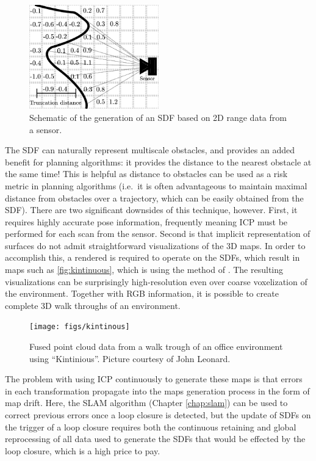 \begin{figure}
    \centering
    \includegraphics[width=0.5\textwidth]{figs/sdf.png}
    \caption{Schematic of the generation of an SDF based on 2D range data from a sensor.\label{fig:sdf}}
\end{figure}


The SDF can naturally represent multiscale obstacles, and provides an added
benefit for planning algorithms: it provides the distance to the nearest
obstacle at the same time! This is helpful as distance to obstacles can be used
as a risk metric in planning algorithms (i.e.\ it is often advantageous to
maintain maximal distance from obstacles over a trajectory, which can be easily
obtained from the SDF). There are two significant downsides of this technique,
however.  First, it requires highly accurate pose information, frequently
meaning ICP must be performed for each scan from the sensor. Second is that
implicit representation of surfaces do not admit straightforward visualizations
of the 3D maps. In order to accomplish this, a rendered is required to operate
on the SDFs, which result in maps such as \cref{fig:kintinuous}, which is using
the method of \cite{whelan2013robust}.  The resulting visualizations can be
surprisingly high-resolution even over coarse voxelization of the environment.
Together with RGB information, it is possible to create complete 3D walk
throughs of an environment.

\begin{figure}
    \centering
    \texttt{[image: figs/kintinous]}
    \caption{Fused point cloud data from a walk trough of an office environment using ``Kintinious''. Picture courtesy of John Leonard.\label{fig:kintinous}}
\end{figure}


The problem with using ICP continuously to generate these maps is that errors
in each transformation propagate into the maps generation process in the form
of map drift. Here, the SLAM algorithm (Chapter
\ref{chap:slam}) can be used to correct previous errors
once a loop closure is detected, but the update of SDFs on the trigger of a loop
closure requires both the continuous retaining and global reprocessing of all
data used to generate the SDFs that would be effected by the loop closure, which
is a high price to pay.

